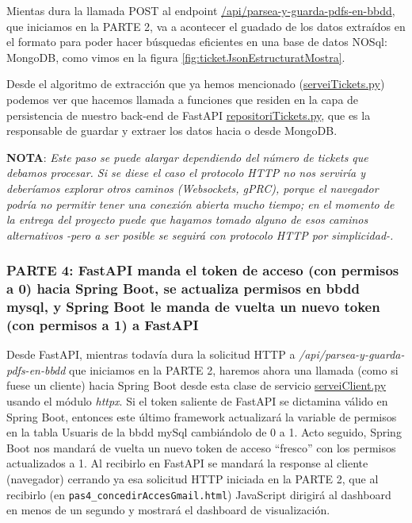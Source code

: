 \documentclass[a4paper,12pt]{report}
\begin{document}
		
		Mientas dura la llamada POST al endpoint \href{https://github.com/blackcub3s/mercApp/blob/f5413ed8cf7ed88c5ed18299564b836d27c52bd4/APP%20WEB/__FastAPI__/app/controlador.py#L132-L152}{/api/parsea-y-guarda-pdfs-en-bbdd}, que iniciamos en la PARTE 2, va a acontecer el guadado de los datos extraídos en el formato para poder hacer búsquedas eficientes en una base de datos NOSql: MongoDB, como vimos en la figura \ref{fig:ticketJsonEstructuratMostra}.
		
		Desde el algoritmo de extracción que ya hemos mencionado (\href{https://github.com/blackcub3s/mercApp/blob/main/APP%20WEB/__FastAPI__/app/serveiTickets.py}{serveiTickets.py}) podemos ver que hacemos llamada a funciones que residen en la capa de persistencia de nuestro back-end de FastAPI \href{https://github.com/blackcub3s/mercApp/blob/main/APP%20WEB/__FastAPI__/app/repositoriTickets.py}{repositoriTickets.py}, que es la responsable de guardar y extraer los datos hacia o desde MongoDB.
		
		\textbf{NOTA}: \textit{Este paso se puede alargar dependiendo del número de tickets que debamos procesar. Si se diese el caso el protocolo HTTP no nos serviría y deberíamos explorar otros caminos (Websockets, gPRC), porque el navegador podría no permitir tener una conexión abierta mucho tiempo; en el momento de la entrega del proyecto puede que hayamos tomado alguno de esos caminos alternativos -pero a ser posible se seguirá con protocolo HTTP por simplicidad-.}
		
		
		
		
		
		
		
		
		
		
		\subsubsection{PARTE 4: FastAPI manda el token de acceso (con permisos a 0) hacia Spring Boot, se actualiza permisos en bbdd mysql, y Spring Boot le manda de vuelta un nuevo token (con permisos a 1) a FastAPI}
		\label{sec:PARTE4_FASTAPI}
		
		Desde FastAPI, mientras todavía dura la solicitud HTTP a \textit{/api/parsea-y-guarda-pdfs-en-bbdd} que iniciamos en la PARTE 2, haremos ahora una llamada (como si fuese un cliente) hacia Spring Boot desde esta clase de servicio \href{https://github.com/blackcub3s/mercApp/blob/main/APP%20WEB/__FastAPI__/app/serveiClient.py}{serveiClient.py} usando el módulo \textit{httpx}. Si el token saliente de FastAPI se dictamina válido en Spring Boot, entonces este último framework actualizará la variable de permisos en la tabla Usuaris de la bbdd mySql cambiándolo de 0 a 1. Acto seguido, Spring Boot nos mandará de vuelta un nuevo token de acceso ``fresco'' con los permisos actualizados a 1. Al recibirlo en FastAPI se mandará la response al cliente (navegador) cerrando ya esa solicitud HTTP iniciada en la PARTE 2, que al recibirlo  (en \texttt{pas4\_concedirAccesGmail.html}) JavaScript dirigirá al dashboard en menos de un segundo y mostrará el dashboard de visualización.
		
\end{document}
